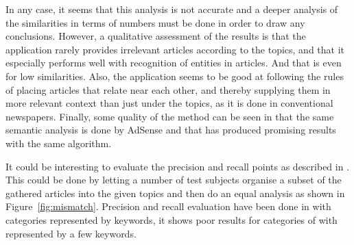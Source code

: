 In any case, it seems that this analysis is not accurate and a deeper analysis of the similarities in terms of numbers must be done in order to draw any conclusions. However, a qualitative assessment of the results is that the application rarely provides irrelevant articles according to the topics, and that it especially performs well with recognition of entities in articles. And that is even for low similarities. Also, the application seems to be good at following the rules of placing articles that relate near each other, and thereby supplying them in more relevant context than just under the topics, as it is done in conventional newspapers. Finally, some quality of the method can be seen in that the same semantic analysis is done by AdSense and that \cite{116262780379.pdf} has produced promising results with the same algorithm.

It could be interesting to evaluate the precision and recall points as described in . This could be done by letting a number of test subjects organise a subset of the gathered articles into the given topics and then do an equal analysis as shown in Figure~\ref{fig:mismatch}. Precision and recall evaluation have been done in \cite{Sections-categories-and-keywords-as-interest-specification-tools-for-personalised-news-services.pdf} with categories represented by keywords, it shows poor results for categories of with represented by a few keywords.

